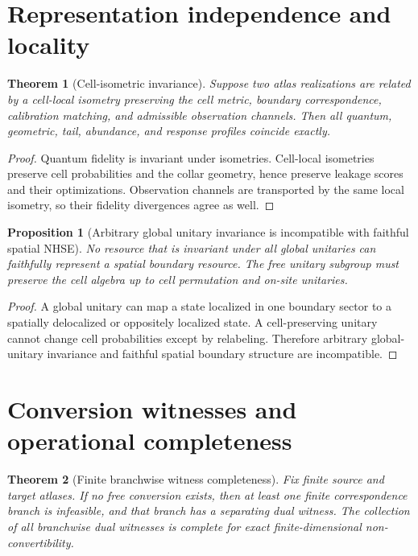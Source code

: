 \documentclass[11pt]{article}
\newtheorem{theorem}{Theorem}
\newtheorem{proposition}{Proposition}
\begin{document}
\section{Representation independence and locality}

\begin{theorem}[Cell-isometric invariance]
Suppose two atlas realizations are related by a cell-local isometry preserving the cell metric, boundary correspondence, calibration matching, and admissible observation channels. Then all quantum, geometric, tail, abundance, and response profiles coincide exactly.
\end{theorem}

\begin{proof}
Quantum fidelity is invariant under isometries. Cell-local isometries preserve cell probabilities and the collar geometry, hence preserve leakage scores and their optimizations. Observation channels are transported by the same local isometry, so their fidelity divergences agree as well.
\end{proof}

\begin{proposition}[Arbitrary global unitary invariance is incompatible with faithful spatial NHSE]
No resource that is invariant under all global unitaries can faithfully represent a spatial boundary resource. The free unitary subgroup must preserve the cell algebra up to cell permutation and on-site unitaries.
\end{proposition}

\begin{proof}
A global unitary can map a state localized in one boundary sector to a spatially delocalized or oppositely localized state. A cell-preserving unitary cannot change cell probabilities except by relabeling. Therefore arbitrary global-unitary invariance and faithful spatial boundary structure are incompatible.
\end{proof}

\section{Conversion witnesses and operational completeness}

\begin{theorem}[Finite branchwise witness completeness]
Fix finite source and target atlases. If no free conversion exists, then at least one finite correspondence branch is infeasible, and that branch has a separating dual witness. The collection of all branchwise dual witnesses is complete for exact finite-dimensional non-convertibility.
\end{theorem}
\end{document}
